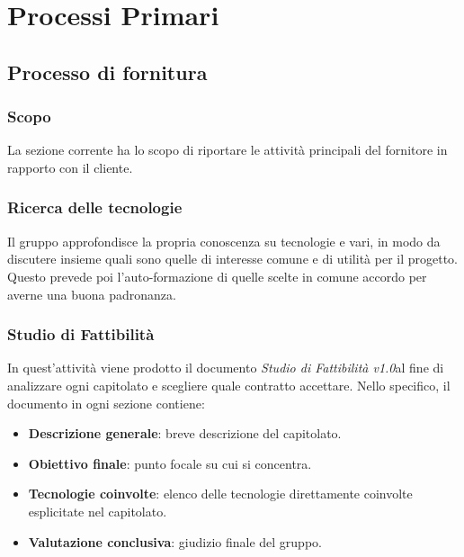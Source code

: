 \section{Processi Primari}\label{PP}

    \subsection{Processo di fornitura}\label{PP:Fornitura}	%

        \subsubsection{Scopo}\label{PP:Fornitura:Scopo}
		La sezione corrente ha lo scopo di riportare le  attività principali del fornitore in rapporto con il cliente. 
		
		\subsubsection{Ricerca delle tecnologie}
		Il gruppo approfondisce la propria conoscenza su tecnologie e  vari, in modo da discutere insieme quali sono quelle di interesse comune e di utilità per il progetto. Questo prevede poi l'auto-formazione di quelle scelte in comune accordo per averne una buona padronanza.

        \subsubsection{Studio di Fattibilità}\label{PP:Fornitura:SdF} 
        In quest'attività viene prodotto il documento \textit{Studio di Fattibilità v1.0}\DAlt al fine di analizzare ogni capitolato e scegliere quale contratto accettare. 
        Nello specifico, il documento in ogni sezione contiene:
        	\begin{itemize}
        		\item \textbf{Descrizione generale}: breve descrizione del capitolato.
        		\item \textbf{Obiettivo finale}: punto focale su cui si concentra.
        		\item \textbf{Tecnologie coinvolte}: elenco delle tecnologie direttamente coinvolte esplicitate nel capitolato.
        		\item \textbf{Valutazione conclusiva}: giudizio finale del gruppo.
        	\end{itemize}
        
